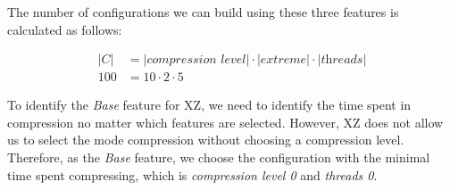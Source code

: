
The number of configurations we can build using these three features is calculated as follows:

\begin{align}
    \lvert C \rvert &= \lvert \textit{compression level} \rvert \cdot \lvert \textit{extreme} \rvert \cdot \lvert \textit{threads} \rvert \\
    100 &= 10 \cdot 2 \cdot 5 \nonumber
\end{align}

To identify the \emph{Base} feature for \textsc{XZ}, we need to identify the time spent in compression no matter which features are selected. 
However, \textsc{XZ} does not allow us to select the mode compression without choosing a compression level. 
Therefore, as the \emph{Base} feature, we choose the configuration with the minimal time spent compressing, 
which is \emph{compression level 0} and \emph{threads 0}.